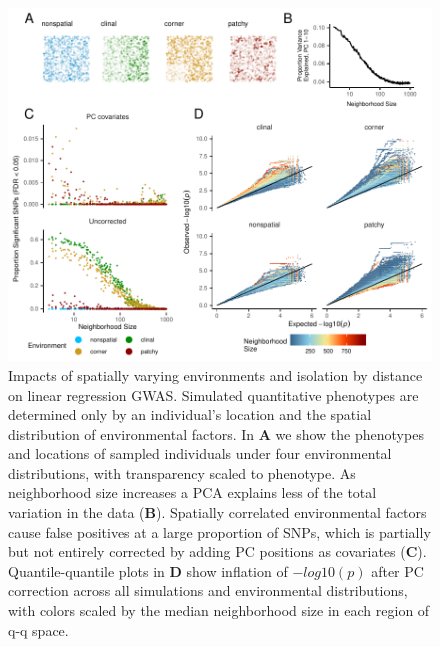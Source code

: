 \documentclass[11pt,twoside,lineno]{preprint}
\begin{document}
\begin{figure}[p]
\centering
\includegraphics[width=\textwidth]{figures/gwas_summary.pdf}
\caption{Impacts of spatially varying environments and isolation by distance on linear regression GWAS. Simulated quantitative phenotypes are determined only by an individual's location and the spatial distribution of environmental factors. In \textbf{A} we show the phenotypes and locations of sampled individuals under four environmental distributions, with transparency scaled to phenotype. As neighborhood size increases a PCA explains less of the total variation in the data (\textbf{B}). Spatially correlated environmental factors cause false positives at a large proportion of SNPs, which is partially but not entirely corrected by adding PC positions as covariates (\textbf{C}). Quantile-quantile plots in \textbf{D} show inflation of $-log10(p)$ after PC correction across all simulations and environmental distributions, with colors scaled by the median neighborhood size in each region of q-q space.
}
\label{fig:gwas}
\end{figure}
\end{document}
